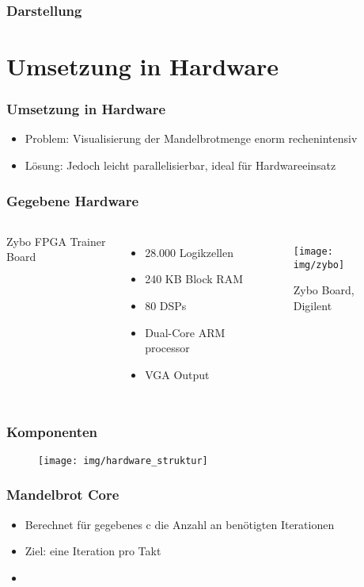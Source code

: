 \documentclass{beamer}
\begin{document}
\begin{frame}
    \frametitle{Darstellung}
\end{frame}

\section{Umsetzung in Hardware}
\begin{frame}
    \frametitle{Umsetzung in Hardware}
    \begin{itemize}
        \item Problem: Visualisierung der Mandelbrotmenge enorm rechenintensiv 
        \item Lösung: Jedoch leicht parallelisierbar, ideal für Hardwareeinsatz
    \end{itemize}
\end{frame}

\begin{frame}
    \frametitle{Gegebene Hardware}
    \begin{columns}[c]
        Zybo FPGA Trainer Board
        \begin{itemize}
            \item 28.000 Logikzellen
            \item 240 KB Block RAM
            \item 80 DSPs
            \item Dual-Core ARM processor
            \item VGA Output
        \end{itemize}

        \begin{figure}
            \texttt{[image: img/zybo]}
            \caption{Zybo Board, Digilent}
        \end{figure}
    \end{columns}
\end{frame}

\begin{frame}
    \frametitle{Komponenten}
    \begin{figure}
        \texttt{[image: img/hardware\_struktur]}
    \end{figure}
\end{frame}

\begin{frame}
    \frametitle{Mandelbrot Core}
    \begin{itemize}
        \item Berechnet für gegebenes c die Anzahl an benötigten Iterationen
        \item Ziel: eine Iteration pro Takt
        \item 
    \end{itemize}
\end{frame}
\end{document}
